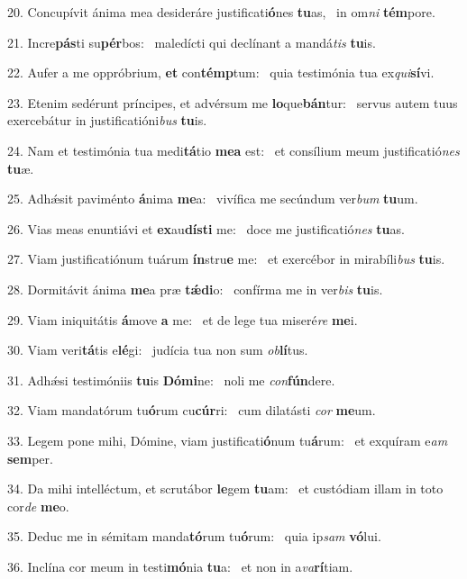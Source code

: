 20. Concupívit ánima mea desideráre justificati\textbf{ó}nes \textbf{tu}as, \ast\  in om\textit{ni} \textbf{tém}pore.\

21. Incre\textbf{pás}ti su\textbf{pér}bos: \ast\  maledícti qui declínant a mandá\textit{tis} \textbf{tu}is.\

22. Aufer a me oppróbrium, \textbf{et} con\textbf{témp}tum: \ast\  quia testimónia tua ex\textit{qui}\textbf{sí}vi.\

23. Etenim sedérunt príncipes, et advérsum me \textbf{lo}que\textbf{bán}tur: \ast\  servus autem tuus exercebátur in justificatióni\textit{bus} \textbf{tu}is.\

24. Nam et testimónia tua medi\textbf{tá}tio \textbf{me}\textbf{a} est: \ast\  et consílium meum justificatió\textit{nes} \textbf{tu}æ.\

25. Adhǽsit paviménto \textbf{á}nima \textbf{me}a: \ast\  vivífica me secúndum ver\textit{bum} \textbf{tu}um.\

26. Vias meas enuntiávi et \textbf{ex}au\textbf{dís}\textbf{ti} me: \ast\  doce me justificatió\textit{nes} \textbf{tu}as.\

27. Viam justificatiónum tuárum \textbf{ín}stru\textbf{e} me: \ast\  et exercébor in mirabíli\textit{bus} \textbf{tu}is.\

28. Dormitávit ánima \textbf{me}a præ \textbf{tǽ}\textbf{di}o: \ast\  confírma me in ver\textit{bis} \textbf{tu}is.\

29. Viam iniquitátis \textbf{á}move \textbf{a} me: \ast\  et de lege tua miseré\textit{re} \textbf{me}i.\

30. Viam veri\textbf{tá}tis e\textbf{lé}gi: \ast\  judícia tua non sum \textit{ob}\textbf{lí}tus.\

31. Adhǽsi testimóniis \textbf{tu}is \textbf{Dó}\textbf{mi}ne: \ast\  noli me \textit{con}\textbf{fún}dere.\

32. Viam mandatórum tu\textbf{ó}rum cu\textbf{cúr}ri: \ast\  cum dilatásti \textit{cor} \textbf{me}um.\

33. Legem pone mihi, Dómine, viam justificati\textbf{ó}num tu\textbf{á}rum: \ast\  et exquíram e\textit{am} \textbf{sem}per.\

34. Da mihi intelléctum, et scrutábor \textbf{le}gem \textbf{tu}am: \ast\  et custódiam illam in toto cor\textit{de} \textbf{me}o.\

35. Deduc me in sémitam manda\textbf{tó}rum tu\textbf{ó}rum: \ast\  quia ip\textit{sam} \textbf{vó}lui.\

36. Inclína cor meum in testi\textbf{mó}nia \textbf{tu}a: \ast\  et non in a\textit{va}\textbf{rí}tiam.\

